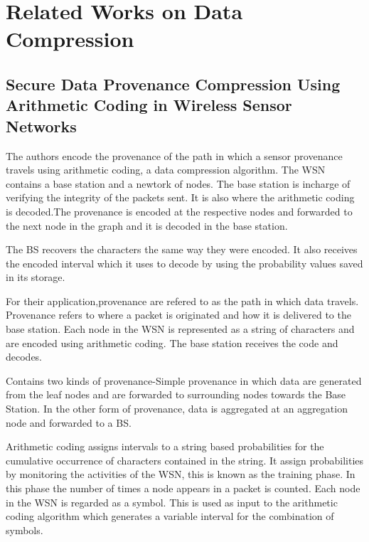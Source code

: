 \section{Related Works on Data Compression}

\subsection{Secure Data Provenance Compression Using Arithmetic Coding in Wireless Sensor Networks}

The authors encode the provenance of the path in which a sensor provenance travels using arithmetic coding, a data compression algorithm. The WSN contains a base station and a newtork of nodes. The base station is incharge of verifying the integrity of the packets sent. It is also where the arithmetic coding is decoded.The provenance is encoded at the respective nodes and forwarded to the next node in the graph and it is decoded in the base station. 

The BS recovers the characters the same way they were encoded. It also receives the encoded interval which it uses to decode by using the probability values saved in its storage.



For their application,provenance are refered to as the path in which data travels. Provenance refers to where a packet is originated and how it is delivered to the base station. Each node in the WSN is represented as a string of characters and are encoded using arithmetic coding. The base station receives the code and decodes.

Contains two kinds of provenance-Simple provenance in which data are generated from the leaf nodes and are forwarded to surrounding nodes towards the Base Station. In the other form of provenance, data is aggregated at an aggregation node and forwarded to a BS.

Arithmetic coding assigns intervals to a string based  probabilities for the cumulative occurrence of characters contained in the string. It assign probabilities by monitoring the activities of the WSN, this is known as the training phase. In this phase the number of times a node appears in a packet is counted.  Each node in the WSN is regarded as a symbol. This is used as input to the arithmetic coding algorithm which generates a variable interval for the combination of symbols.
















